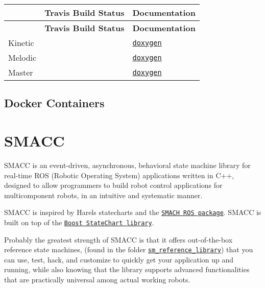 \tabulinesep=1mm
\begin{longtabu} spread 0pt [c]{*3{|X[-1]}|}
\hline
{}&{\bf Travis Build Status }&{\bf Documentation  }\\
\endfirsthead
\hline
\endfoot
\hline
{}&{\bf Travis Build Status }&{\bf Documentation  }\\
\endhead
Kinetic & &\href{https://reelrbtx.github.io/SMACC_Documentation/kinetic-devel/html/namespaces.html}{\tt doxygen} \\
Melodic & &\href{https://reelrbtx.github.io/SMACC_Documentation/melodic-devel/html/namespaces.html}{\tt doxygen} \\
Master & &\href{https://reelrbtx.github.io/SMACC_Documentation/master/html/namespaces.html}{\tt doxygen} \\
\end{longtabu}


\subsection*{Docker Containers}

\href{https://hub.docker.com/r/pabloinigoblasco/smacc/}{\tt } \href{https://hub.docker.com/r/pabloinigoblasco/smacc/}{\tt } \href{https://registry.hub.docker.com/pabloinigoblasco/smacc/}{\tt }

\section*{S\+M\+A\+CC}

S\+M\+A\+CC is an event-\/driven, asynchronous, behavioral state machine library for real-\/time R\+OS (Robotic Operating System) applications written in C++, designed to allow programmers to build robot control applications for multicomponent robots, in an intuitive and systematic manner.

S\+M\+A\+CC is inspired by Harel\textquotesingle{}s statecharts and the \href{http://wiki.ros.org/smach}{\tt S\+M\+A\+CH R\+OS package}. S\+M\+A\+CC is built on top of the \href{https://www.boost.org/doc/libs/1_53_0/libs/statechart/doc/index.html}{\tt Boost State\+Chart library}.

Probably the greatest strength of S\+M\+A\+CC is that it offers out-\/of-\/the-\/box reference state machines, (found in the folder \href{https://github.com/reelrbtx/SMACC/tree/master/smacc_sm_reference_library}{\tt sm\+\_\+reference\+\_\+library}) that you can use, test, hack, and customize to quickly get your application up and running, while also knowing that the library supports advanced functionalities that are practically universal among actual working robots.

